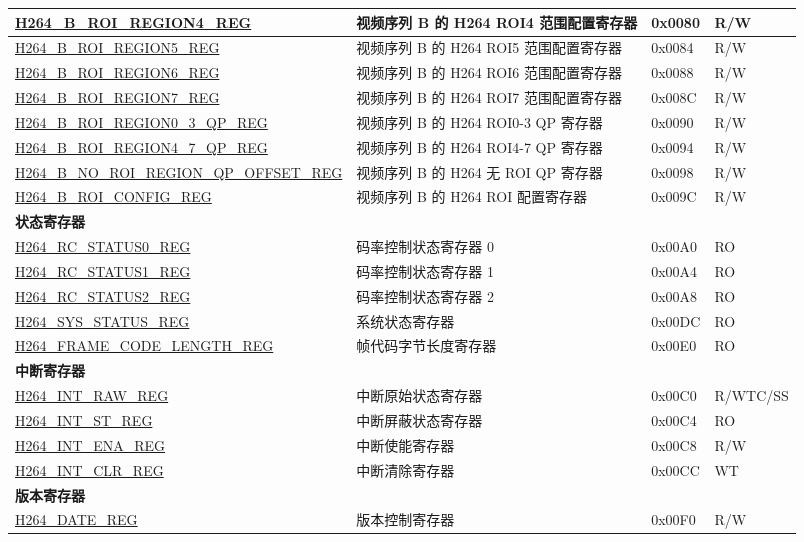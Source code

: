 \begin{longtable}{ | p{7cm} | p{6.2cm} | p{1.2cm} | p{1cm} | }
\hyperref[regdesc:H264BROIREGION4REG]{H264\_B\_ROI\_REGION4\_REG} & 视频序列 B 的 H264 ROI4 范围配置寄存器 & 0x0080 & R/W \\ \hline
\hyperref[regdesc:H264BROIREGION5REG]{H264\_B\_ROI\_REGION5\_REG} & 视频序列 B 的 H264 ROI5 范围配置寄存器 & 0x0084 & R/W \\ \hline
\hyperref[regdesc:H264BROIREGION6REG]{H264\_B\_ROI\_REGION6\_REG} & 视频序列 B 的 H264 ROI6 范围配置寄存器 & 0x0088 & R/W \\ \hline
\hyperref[regdesc:H264BROIREGION7REG]{H264\_B\_ROI\_REGION7\_REG} & 视频序列 B 的 H264 ROI7 范围配置寄存器 & 0x008C & R/W \\ \hline
\hyperref[regdesc:H264BROIREGION03QPREG]{H264\_B\_ROI\_REGION0\_3\_QP\_REG} & 视频序列 B 的 H264 ROI0-3 QP 寄存器 & 0x0090 & R/W \\ \hline
\hyperref[regdesc:H264BROIREGION47QPREG]{H264\_B\_ROI\_REGION4\_7\_QP\_REG} & 视频序列 B 的 H264 ROI4-7 QP 寄存器 & 0x0094 & R/W \\ \hline
\hyperref[regdesc:H264BNOROIREGIONQPOFFSETREG]{H264\_B\_NO\_ROI\_REGION\_QP\_OFFSET\_REG} & 视频序列 B 的 H264 无 ROI QP 寄存器 & 0x0098 & R/W \\ \hline
\hyperref[regdesc:H264BROICONFIGREG]{H264\_B\_ROI\_CONFIG\_REG} & 视频序列 B 的 H264 ROI 配置寄存器 & 0x009C & R/W \\ \hline

\multicolumn{4}{|l|}{\textbf{状态寄存器}} \\ \hline
\hyperref[regdesc:H264RCSTATUS0REG]{H264\_RC\_STATUS0\_REG} & 码率控制状态寄存器 0 & 0x00A0 & RO \\ \hline
\hyperref[regdesc:H264RCSTATUS1REG]{H264\_RC\_STATUS1\_REG} & 码率控制状态寄存器 1 & 0x00A4 & RO \\ \hline
\hyperref[regdesc:H264RCSTATUS2REG]{H264\_RC\_STATUS2\_REG} & 码率控制状态寄存器 2 & 0x00A8 & RO \\ \hline
\hyperref[regdesc:H264SYSSTATUSREG]{H264\_SYS\_STATUS\_REG} & 系统状态寄存器 & 0x00DC & RO \\ \hline
\hyperref[regdesc:H264FRAMECODELENGTHREG]{H264\_FRAME\_CODE\_LENGTH\_REG} & 帧代码字节长度寄存器 & 0x00E0 & RO \\ \hline
\multicolumn{4}{|l|}{\textbf{中断寄存器}} \\ \hline
\hyperref[regdesc:H264INTRAWREG]{H264\_INT\_RAW\_REG} & 中断原始状态寄存器 & 0x00C0 & R/WTC/SS \\ \hline
\hyperref[regdesc:H264INTSTREG]{H264\_INT\_ST\_REG} & 中断屏蔽状态寄存器 & 0x00C4 & RO \\ \hline
\hyperref[regdesc:H264INTENAREG]{H264\_INT\_ENA\_REG} & 中断使能寄存器 & 0x00C8 & R/W \\ \hline
\hyperref[regdesc:H264INTCLRREG]{H264\_INT\_CLR\_REG} & 中断清除寄存器 & 0x00CC & WT \\ \hline
\multicolumn{4}{|l|}{\textbf{版本寄存器}} \\ \hline
\hyperref[regdesc:H264DATEREG]{H264\_DATE\_REG} & 版本控制寄存器 & 0x00F0 & R/W \\ \hline
\end{longtable}
